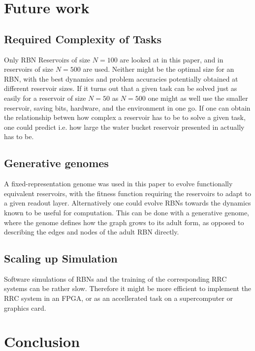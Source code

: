\section{Future work}

\subsection{Required Complexity of Tasks}

Only RBN Reservoirs of size $N=100$ are looked at in this paper,
and in \cite{rbn-reservoir} reservoirs of size $N=500$ are used.
Neither might be the optimal size for an RBN,
with the best dynamics and problem accuracies potentially obtained at different reservoir sizes.
If it turns out that a given task can be solved just as easily for a reservoir of size $N=50$ as $N=500$ one might as well use the smaller reservoir,
saving bits, hardware, and the environment in one go.
If one can obtain the relationship betwen how complex a reservoir has to be to solve a given task,
one could predict i.e. how large the water bucket reservoir presented in \cite{fernando2003pattern} actually has to be.

\subsection{Generative genomes}

A fixed-representation genome was used in this paper to evolve functionally equivalent reservoirs,
with the fitness function requiring the reservoirs to adapt to a given readout layer.
Alternatively one could evolve RBNs towards the dynamics known to be useful for computation.
This can be done with a generative genome, where the genome defines how the graph grows to its adult form,
as opposed to describing the edges and nodes of the adult RBN directly.

\subsection{Scaling up Simulation}

Software simulations of RBNs and the training of the corresponding RRC systems can be rather slow.
Therefore it might be more efficient to implement the RRC system in an FPGA,
or as an accellerated task on a supercomputer or graphics card.

\section{Conclusion}



